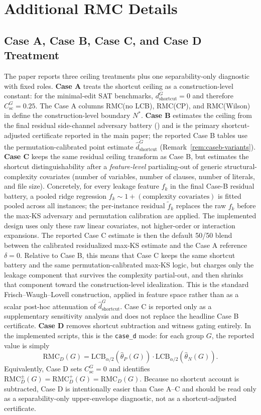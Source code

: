 \documentclass[conference]{IEEEtran}
\theoremstyle{remark}
\newcommand{\LCB}{\mathrm{LCB}}
\newcommand{\RMC}{\mathrm{RMC}}
\newcommand{\shortcutDisc}{d_{\mathrm{shortcut}}^{G}}
\newcommand{\hatshortcutDisc}{\hat d_{\mathrm{shortcut}}^{G}}
\newcommand{\shortcutCeiling}{C_{\mathrm{sc}}^{G}}
\begin{document}
\section{Additional RMC Details}
\label{app:rmc_details}

\subsection{Case A, Case B, Case C, and Case D Treatment}

The paper reports three ceiling treatments plus one separability-only diagnostic with fixed roles.
\textbf{Case A} treats the shortcut ceiling as a construction-level constant:
for the minimal-edit SAT benchmarks, $\shortcutDisc=0$ and therefore
$\shortcutCeiling=0.25$.
The Case A columns RMC(no LCB), RMC(CP), and RMC(Wilson) in
 define the construction-level boundary $N^*$.
\textbf{Case B} estimates the ceiling from the final residual side-channel adversary
battery () and is the primary shortcut-adjusted
certificate reported in the main paper; the reported Case B tables use the
permutation-calibrated point estimate $\hatshortcutDisc$
(Remark~\ref{rem:caseb-variants}).
\textbf{Case C} keeps the same residual ceiling transform as Case B, but
estimates the shortcut distinguishability after a \emph{feature-level}
partialing-out of generic structural-complexity covariates (number of
variables, number of clauses, number of literals, and file size).  Concretely,
for every leakage feature $f_k$ in the final Case-B residual battery, a pooled ridge regression
$f_k\sim 1 + (\text{complexity covariates})$ is fitted pooled across all
instances; the per-instance residual $\tilde f_k$ replaces the raw $f_k$
before the max-KS adversary and permutation calibration are applied.  The implemented design uses only these raw linear covariates, not higher-order or interaction expansions.  The reported Case C estimate is then the default 50/50 blend between the calibrated residualized max-KS estimate and the Case A reference $\delta=0$.  Relative to Case B, this means that Case C keeps the same shortcut battery and the same permutation-calibrated max-KS logic, but charges only the leakage component that survives the complexity partial-out, and then shrinks that component toward the construction-level idealization.  This
is the standard Frisch--Waugh--Lovell construction, applied in feature space
rather than as a scalar post-hoc attenuation of $\hatshortcutDisc$.  Case C is
reported only as a supplementary sensitivity analysis and does not replace
the headline Case B certificate.
\textbf{Case D} removes shortcut subtraction and witness gating entirely.
In the implemented scripts, this is the \texttt{case\_d} mode: for each group
$G$, the reported value is simply
\[
\RMC_D(G)=\LCB_{\alpha/2}(\hat\theta_P(G))\cdot\LCB_{\alpha/2}(\hat\theta_N(G)).
\]
Equivalently, Case D sets $\shortcutCeiling=0$ and identifies
$\RMC_D^{\pm}(G)=\RMC_D^{+}(G)=\RMC_D(G)$.
Because no shortcut account is subtracted, Case D is intentionally easier than
Case A--C and should be read only as a separability-only upper-envelope
diagnostic, not as a shortcut-adjusted certificate.
\end{document}
